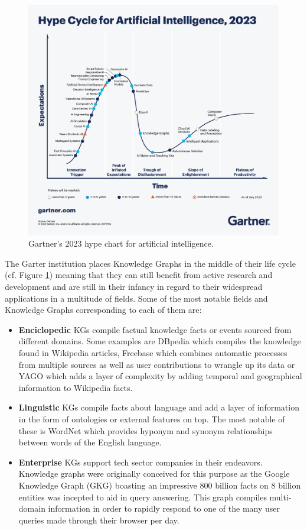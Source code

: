 \begin{figure}[!htp]
    \centering
    \includegraphics[width=\textwidth]{fig/intro/Gartner_2023.png}
    \caption{Gartner's 2023 hype chart for artificial intelligence.}
    \label{fig:garter-chart}
\end{figure}

The Garter institution places Knowledge Graphs in the middle of their life cycle (cf. Figure \ref{fig:garter-chart}) meaning that they can still benefit from active research and development and are still in their infancy in regard to their widespread applications in a multitude of fields. Some of the most notable fields and Knowledge Graphs corresponding to each of them are:
\begin{itemize}
    \item \textbf{Enciclopedic} KGs compile factual knowledge facts or events sourced from different domains. Some examples are DBpedia\cite{auer2007dbpedia} which compiles the knowledge found in Wikipedia articles, Freebase\cite{bollacker2007freebase} which combines automatic processes from multiple sources as well as user contributions to wrangle up its data or YAGO\cite{suchanek2007yago} which adds a layer of complexity by adding temporal and geographical information to Wikipedia facts.
    \item \textbf{Linguistic} KGs compile facts about language and add a layer of information in the form of ontologies or external features on top. The most notable of these is WordNet\cite{miller1995wordnet} which provides hyponym and synonym relationships between words of the English language.
    \item \textbf{Enterprise} KGs support tech sector companies in their endeavors. Knowledge graphs were originally conceived for this purpose as the Google Knowledge Graph (GKG) \cite{steiner2012adding} boasting an impressive 800 billion facts on 8 billion entities was incepted to aid in query answering. This graph compiles multi-domain information in order to rapidly respond to one of the many user queries made through their browser per day. 
    
\end{itemize}

